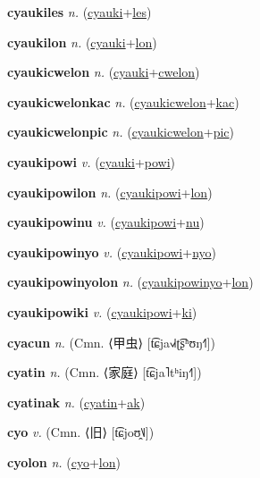 \textbf{\hypertarget{cyaukiles}{cyaukiles}} \textit{n.} (\hyperlink{cyauki}{cyauki}+\allowbreak \hyperlink{les}{les})


\textbf{\hypertarget{cyaukilon}{cyaukilon}} \textit{n.} (\hyperlink{cyauki}{cyauki}+\allowbreak \hyperlink{lon}{lon})


\textbf{\hypertarget{cyaukicwelon}{cyaukicwelon}} \textit{n.} (\hyperlink{cyauki}{cyauki}+\allowbreak \hyperlink{cwelon}{cwelon})


\textbf{\hypertarget{cyaukicwelonkac}{cyaukicwelonkac}} \textit{n.} (\hyperlink{cyaukicwelon}{cyaukicwelon}+\allowbreak \hyperlink{kac}{kac})


\textbf{\hypertarget{cyaukicwelonpic}{cyaukicwelonpic}} \textit{n.} (\hyperlink{cyaukicwelon}{cyaukicwelon}+\allowbreak \hyperlink{pic}{pic})


\textbf{\hypertarget{cyaukipowi}{cyaukipowi}} \textit{v.} (\hyperlink{cyauki}{cyauki}+\allowbreak \hyperlink{powi}{powi})


\textbf{\hypertarget{cyaukipowilon}{cyaukipowilon}} \textit{n.} (\hyperlink{cyaukipowi}{cyaukipowi}+\allowbreak \hyperlink{lon}{lon})


\textbf{\hypertarget{cyaukipowinu}{cyaukipowinu}} \textit{v.} (\hyperlink{cyaukipowi}{cyaukipowi}+\allowbreak \hyperlink{nu}{nu})


\textbf{\hypertarget{cyaukipowinyo}{cyaukipowinyo}} \textit{v.} (\hyperlink{cyaukipowi}{cyaukipowi}+\allowbreak \hyperlink{nyo}{nyo})


\textbf{\hypertarget{cyaukipowinyolon}{cyaukipowinyolon}} \textit{n.} (\hyperlink{cyaukipowinyo}{cyaukipowinyo}+\allowbreak \hyperlink{lon}{lon})


\textbf{\hypertarget{cyaukipowiki}{cyaukipowiki}} \textit{v.} (\hyperlink{cyaukipowi}{cyaukipowi}+\allowbreak \hyperlink{ki}{ki})


\textbf{\hypertarget{cyacun}{cyacun}} \textit{n.} (Cmn. ⟨{\chinese{}甲虫}⟩ [t͡ɕja˧˩˧ʈ͡ʂʰʊŋ˧˥])


\textbf{\hypertarget{cyatin}{cyatin}} \textit{n.} (Cmn. ⟨{\chinese{}家庭}⟩ [t͡ɕja˥tʰiŋ˧˥])


\textbf{\hypertarget{cyatinak}{cyatinak}} \textit{n.} (\hyperlink{cyatin}{cyatin}+\allowbreak \hyperlink{ak}{ak})


\textbf{\hypertarget{cyo}{cyo}} \textit{v.} (Cmn. ⟨{\chinese{}旧}⟩ [t͡ɕjoʊ̯˥˩])


\textbf{\hypertarget{cyolon}{cyolon}} \textit{n.} (\hyperlink{cyo}{cyo}+\allowbreak \hyperlink{lon}{lon})


